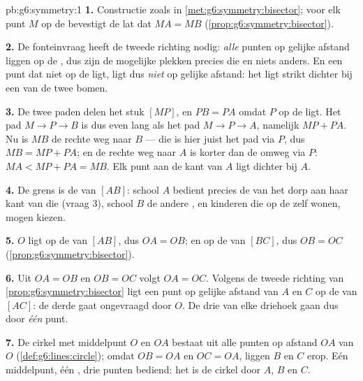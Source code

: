 \begin{solution}{pb:g6:symmetry:1}
\textbf{1.} Constructie zoals in \cref{met:g6:symmetry:bisector}; voor elk punt
$M$ op de  bevestigt de lat dat $MA = MB$
(\cref{prop:g6:symmetry:bisector}).

\textbf{2.} De fonteinvraag heeft de tweede richting nodig: \emph{alle} punten
op gelijke afstand liggen op de , dus zijn de mogelijke plekken
precies die  en niets anders. En een punt dat niet op de  ligt,
ligt dus \emph{niet} op gelijke afstand: het ligt strikt dichter bij een van de
twee bomen.

\textbf{3.} De twee paden delen het stuk $[MP]$, en $PB = PA$ omdat $P$ op de
 ligt. Het pad $M \to P \to B$ is dus even lang als het pad
$M \to P \to A$, namelijk $MP + PA$. Nu is $MB$ de rechte weg naar $B$ --- die is
hier juist het pad via $P$, dus $MB = MP + PA$; en de rechte weg naar $A$ is
korter dan de omweg via $P$: $MA < MP + PA = MB$. Elk punt aan de kant van $A$
ligt dichter bij $A$.

\textbf{4.} De grens is de  van $[AB]$: school $A$ bedient precies
de  van het dorp aan haar kant van die  (vraag 3), school $B$ de andere
, en kinderen die op de  zelf wonen, mogen kiezen.

\textbf{5.} $O$ ligt op de  van $[AB]$, dus $OA = OB$; en op de
 van $[BC]$, dus $OB = OC$
(\cref{prop:g6:symmetry:bisector}).

\textbf{6.} Uit $OA = OB$ en $OB = OC$ volgt $OA = OC$. Volgens de tweede
richting van \cref{prop:g6:symmetry:bisector} ligt een punt op gelijke afstand
van $A$ en $C$ op de  van $[AC]$: de derde  gaat
ongevraagd door $O$. De drie  van elke driehoek gaan dus door
\emph{één} punt.

\textbf{7.} De cirkel met middelpunt $O$ en  $OA$ bestaat uit alle punten
op afstand $OA$ van $O$ (\cref{def:g6:lines:circle}); omdat $OB = OA$ en
$OC = OA$, liggen $B$ en $C$ erop. Eén middelpunt, één , drie punten
bediend: het is de cirkel door $A$, $B$ en $C$.


\end{solution}
